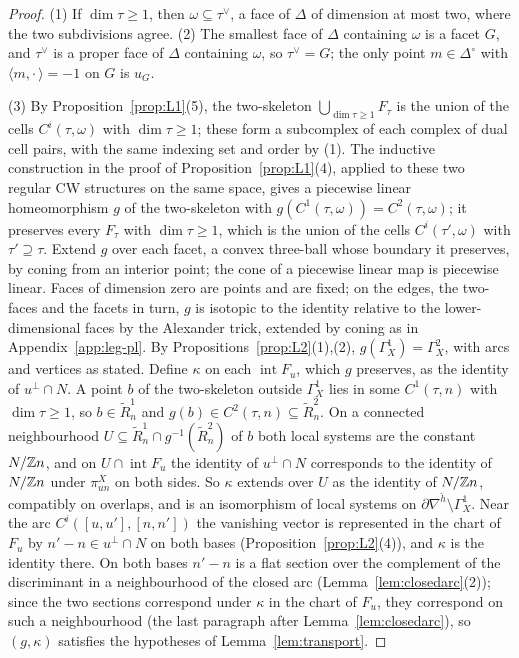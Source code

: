 \begin{proof}
(1) If $\dim\tau\ge1$, then $\omega\subseteq\tau^\vee$, a face of $\Delta$ of dimension at most two, where the two
subdivisions agree. (2) The smallest face of $\Delta$ containing $\omega$ is a facet $G$, and $\tau^\vee$ is a proper face
of $\Delta$ containing $\omega$, so $\tau^\vee=G$; the only point $m\in\Delta^\circ$ with $\langle m,\cdot\,\rangle=-1$ on
$G$ is $u_G$.

(3) By Proposition~\ref{prop:L1}(5), the two-skeleton $\bigcup_{\dim\tau\ge1}F_\tau$ is the union of the cells
$C^i(\tau,\omega)$ with $\dim\tau\ge1$; these form a subcomplex of each complex of dual cell pairs, with the same indexing set and
order by (1). The inductive construction in the proof of Proposition~\ref{prop:L1}(4), applied to these two regular CW
structures on the same space, gives a piecewise linear homeomorphism $g$ of the two-skeleton with
$g(C^1(\tau,\omega))=C^2(\tau,\omega)$; it preserves every $F_\tau$ with $\dim\tau\ge1$, which is the union of the cells
$C^i(\tau',\omega)$ with $\tau'\supseteq\tau$. Extend $g$ over each facet, a convex three-ball whose boundary it preserves,
by coning from an interior point; the cone of a piecewise linear map is piecewise linear. Faces of dimension zero are
points and are fixed; on the edges, the two-faces and the facets in turn, $g$ is isotopic to the identity relative to the
lower-dimensional faces by the Alexander trick, extended by coning as in Appendix~\ref{app:leg-pl}. By
Propositions~\ref{prop:L2}(1),(2), $g(\Gamma^1_X)=\Gamma^2_X$, with arcs and vertices as stated. Define $\kappa$ on each
$\operatorname{int}F_u$, which $g$ preserves, as the identity of $u^\perp\cap N$. A point $b$ of the two-skeleton outside
$\Gamma^1_X$ lies in some $C^1(\tau,n)$ with $\dim\tau\ge1$, so $b\in\widetilde R^1_n$ and $g(b)\in C^2(\tau,n)\subseteq
\widetilde R^2_n$. On a connected neighbourhood $U\subseteq\widetilde R^1_n\cap g^{-1}(\widetilde R^2_n)$ of $b$ both local
systems are the constant $N/\mathbb Z n$, and on $U\cap\operatorname{int}F_u$ the identity of $u^\perp\cap N$ corresponds to the
identity of $N/\mathbb Z n$ under $\pi^X_{un}$ on both sides. So $\kappa$ extends over $U$ as the identity of $N/\mathbb Z n$, compatibly
on overlaps, and is an isomorphism of local systems on $\partial\nabla^{\check h}\setminus\Gamma^1_X$. Near the arc
$C^i([u,u'],[n,n'])$ the vanishing vector is represented in the chart of $F_u$ by $n'-n\in u^\perp\cap N$ on both bases
(Proposition~\ref{prop:L2}(4)), and $\kappa$ is the identity there. On both bases $n'-n$ is a flat section over the complement
of the discriminant in a neighbourhood of the closed arc (Lemma~\ref{lem:closedarc}(2)); since the two sections correspond
under $\kappa$ in the chart of $F_u$, they correspond on such a neighbourhood (the last paragraph after Lemma~\ref{lem:closedarc}), so
$(g,\kappa)$ satisfies the hypotheses of Lemma~\ref{lem:transport}.


\end{proof}
